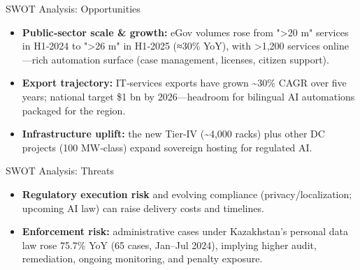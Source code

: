 \documentclass[aspectratio=169,14pt]{beamer}
\begin{document}
\begin{frame}{SWOT Analysis: Opportunities}
  \hspace{1.5cm}%
  \begin{minipage}{0.82\textwidth}
    \begin{itemize}
      \setlength\itemsep{0.7em}
      \item \textbf{\color{Accent}Public‑sector scale \& growth:} eGov volumes rose from ">20 m" services in H1‑2024 to ">26 m" in H1‑2025 (≈30\% YoY), with >1,200 services online—rich automation surface (case management, licenses, citizen support).

      \item \textbf{\color{Accent}Export trajectory:} IT‑services exports have grown \textasciitilde30\% CAGR over five years; national target \$1 bn by 2026—headroom for bilingual AI automations packaged for the region.

      \item \textbf{\color{Accent}Infrastructure uplift:} the new Tier‑IV (\textasciitilde4,000 racks) plus other DC projects (100 MW‑class) expand sovereign hosting for regulated AI.
    \end{itemize}
  \end{minipage}
\end{frame}

\begin{frame}{SWOT Analysis: Threats}
  \hspace{1.5cm}%
  \begin{minipage}{0.82\textwidth}
    \large
    \begin{itemize}
      \setlength\itemsep{1em}
      \item \textbf{\color{Primary}Regulatory execution risk} and evolving compliance (privacy/localization; upcoming AI law) can raise delivery costs and timelines.

      \item \textbf{\color{Primary}Enforcement risk:} administrative cases under Kazakhstan's personal data law rose 75.7\% YoY (65 cases, Jan–Jul 2024), implying higher audit, remediation, ongoing monitoring, and penalty exposure.
    \end{itemize}
  \end{minipage}
\end{frame}
\end{document}
